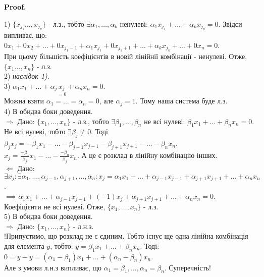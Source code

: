 \documentclass[a4paper, 10pt]{article}
\makeatletter
\def\rightproof{$\boxed{\Rightarrow}$ }
\def\leftproof{$\boxed{\Leftarrow}$ }
\theoremstyle{theoremdd}
\renewenvironment{proof}[1][Proof.\\]{\par
\pushQED{\hfill \qed}%
\normalfont \topsep6\p@\@plus6\p@\relax
\trivlist
\item\relax
{\bfseries
#1\@addpunct{.}}\hspace\labelsep\ignorespaces
}{%
\popQED\endtrivlist\@endpefalse
}
\makeatother
\begin{document}
	\begin{proof}
	1) $\{x_{j_1} \dots, x_{j_k}\}$ - л.з., тобто $\exists \alpha_1, \dots, \alpha_k$ ненулеві: $\alpha_1 x_{j_1} + \dots + \alpha_k x_{j_k} = 0$. Звідси випливає, що:\\
	$0x_1 + 0x_2 + \dots + 0x_{j_1-1} + \alpha_1 x_{j_1} + 0x_{j_1 + 1} + \dots + \alpha_k x_{j_k} + \dots + 0 x_n = 0$.\\
	При цьому більшість коефіцієнтів в новій лінійнії комбінації - ненулеві. Отже, $\{x_1 \dots, x_n\}$ - л.з.
	\bigskip \\
	2) \textit{наслідок 1).}
	\bigskip \\
	3) $\alpha_1 x_1 + \dots + \alpha_j \underset{=0}{x_j} + \alpha_n x_n = 0$.\\
	Можна взяти $\alpha_1 = \dots = \alpha_n = 0$, але $\alpha_j = 1$. Тому наша система буде л.з.
	\bigskip \\
	4) В обидва боки доведення.\\
	\rightproof Дано: $\{x_1, \dots, x_n\}$ - л.з., тобто $\exists \beta_1, \dots, \beta_n$ не всі нулеві: $\beta_1 x_1 + \dots + \beta_n x_n = 0$.\\
	Не всі нулеві, тобто $\exists \beta_j \neq 0$. Тоді
	$\beta_j x_j = -\beta_1 x_1 - \dots - \beta_{j-1} x_{j-1} - \beta_{j+1} x_{j+1} - \dots - \beta_n x_n$.\\
	$\displaystyle x_j = \frac{-\beta_1}{\beta_j}x_1 - \dots - \frac{-\beta_n}{\beta_j}x_n$. А це є розклад в лінійну комбінацію інших.
	\bigskip \\
	\leftproof Дано: $\exists x_j: \exists \alpha_1, \dots, \alpha_{j-1}, \alpha_{j+1}, \dots, \alpha_n: x_j = \alpha_1 x_1 + \dots + \alpha_{j-1} x_{j-1} + \alpha_{j+1} x_{j+1} + \dots + \alpha_n x_n$.\\
	$\implies \alpha_1 x_1 + \dots + \alpha_{j-1} x_{j-1} + (-1)x_j + \alpha_{j+1} x_{j+1} + \dots + \alpha_n x_n = 0$.\\
	Коефіцієнти не всі нулеві. Отже, $\{x_1, \dots, x_n\}$ - л.з.
	\bigskip \\
	5) В обидва боки доведення.\\
	\rightproof Дано: $\{x_1, \dots, x_n \}$ - л.н.з.\\
	!Припустимо, що розклад не є єдиним. Тобто існує ще одна лінійна комбінація для елемента $y$, тобто: $y = \beta_1 x_1 + \dots + \beta_n x_n$. Тоді:\\
	$0 = y - y = (\alpha_1 - \beta_1)x_1 + \dots + (\alpha_n - \beta_n)x_n$.\\
	Але з умови л.н.з випливає, що $\alpha_1 = \beta_1, \dots, \alpha_n = \beta_n$. Суперечність! \\ 

\end{proof}
\end{document}
